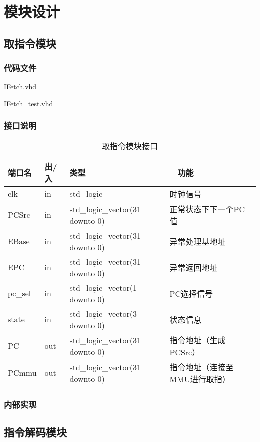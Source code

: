 \section{模块设计}
    \subsection{取指令模块}
        \subsubsection{代码文件}
            IFetch.vhd

            IFetch\_test.vhd
        \subsubsection{接口说明}

            \begin{table}
            \centering
            \caption{取指令模块接口}
            \begin{tabularx}{\textwidth}{|l|l|l|X|}
            \hline
            端口名 & 出/入 & 类型 &　功能 \\
            \hline
            clk & in & std\_logic & 时钟信号　\\
            \hline
            PCSrc & in & std\_logic\_vector(31 downto 0) & 正常状态下下一个PC值 \\
            \hline
            EBase & in & std\_logic\_vector(31 downto 0) & 异常处理基地址 \\
            \hline
            EPC & in & std\_logic\_vector(31 downto 0) & 异常返回地址 \\
            \hline
            pc\_sel & in & std\_logic\_vector(1 downto 0) & PC选择信号 \\
            \hline
            state & in & std\_logic\_vector(3 downto 0) & 状态信息 \\
            \hline
            PC & out & std\_logic\_vector(31 downto 0) & 指令地址（生成PCSrc） \\
            \hline
            PCmmu & out & std\_logic\_vector(31 downto 0) & 指令地址（连接至MMU进行取指） \\
            \hline
            \end{tabularx}
            \end{table}            

        \subsubsection{内部实现}
            
    \subsection{指令解码模块}
    \subsection{}